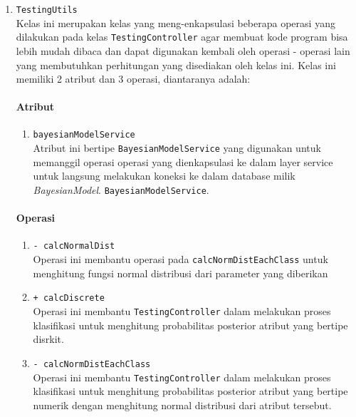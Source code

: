 \begin{enumerate}
\begin{enumerate}
		\end{enumerate}
		
	
	\item \texttt{TestingUtils}\\
	Kelas ini merupakan kelas yang meng-enkapsulasi beberapa operasi yang dilakukan pada kelas \texttt{TestingController} agar membuat kode program bisa lebih mudah dibaca dan dapat digunakan kembali oleh operasi - operasi lain yang membutuhkan perhitungan yang disediakan oleh kelas ini. Kelas ini memiliki 2 atribut dan 3 operasi, diantaranya adalah:
	\paragraph{Atribut}
		\begin{enumerate}
			\item \texttt{bayesianModelService}\\
			Atribut ini bertipe \texttt{BayesianModelService} yang digunakan untuk memanggil operasi operasi yang dienkapsulasi ke dalam layer service untuk langsung melakukan koneksi ke dalam database milik \textit{BayesianModel}. \texttt{BayesianModelService}.
			
		\end{enumerate}				

	\paragraph{Operasi}
		\begin{enumerate}
			\item \texttt{- calcNormalDist}\\
			Operasi ini membantu operasi pada \texttt{calcNormDistEachClass} untuk menghitung fungsi normal distribusi dari parameter yang diberikan
			
			\item \texttt{+ calcDiscrete}\\
			Operasi ini membantu \texttt{TestingController} dalam melakukan proses klasifikasi untuk menghitung probabilitas posterior atribut yang bertipe disrkit.

			\item \texttt{- calcNormDistEachClass}\\
			Operasi ini membantu \texttt{TestingController} dalam melakukan proses klasifikasi untuk menghitung probabilitas posterior atribut yang bertipe numerik dengan menghitung normal distribusi dari atribut tersebut.

		\end{enumerate}
		
		


\end{enumerate}
	

